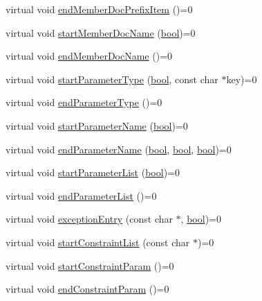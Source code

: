\begin{DoxyCompactItemize}
\item 
virtual void \hyperlink{class_output_generator_a8fa59aa64d420ced1d1784f7b2ddaa79}{end\+Member\+Doc\+Prefix\+Item} ()=0
\item 
virtual void \hyperlink{class_output_generator_a8646f44dc5c56ef3f6d5fa3f667cd223}{start\+Member\+Doc\+Name} (\hyperlink{qglobal_8h_a1062901a7428fdd9c7f180f5e01ea056}{bool})=0
\item 
virtual void \hyperlink{class_output_generator_a02431abad8b2d94216a0530cf08b3dca}{end\+Member\+Doc\+Name} ()=0
\item 
virtual void \hyperlink{class_output_generator_a76af87c960b045eafa035b77307aaf75}{start\+Parameter\+Type} (\hyperlink{qglobal_8h_a1062901a7428fdd9c7f180f5e01ea056}{bool}, const char $\ast$key)=0
\item 
virtual void \hyperlink{class_output_generator_a8c701cf1050103eee69d57b409640dea}{end\+Parameter\+Type} ()=0
\item 
virtual void \hyperlink{class_output_generator_ac56057350d3b14b63238bf4325792f82}{start\+Parameter\+Name} (\hyperlink{qglobal_8h_a1062901a7428fdd9c7f180f5e01ea056}{bool})=0
\item 
virtual void \hyperlink{class_output_generator_a69b117731ab42b3985713760b270a1a5}{end\+Parameter\+Name} (\hyperlink{qglobal_8h_a1062901a7428fdd9c7f180f5e01ea056}{bool}, \hyperlink{qglobal_8h_a1062901a7428fdd9c7f180f5e01ea056}{bool}, \hyperlink{qglobal_8h_a1062901a7428fdd9c7f180f5e01ea056}{bool})=0
\item 
virtual void \hyperlink{class_output_generator_a92e7646944e62d50ede52caa18c39266}{start\+Parameter\+List} (\hyperlink{qglobal_8h_a1062901a7428fdd9c7f180f5e01ea056}{bool})=0
\item 
virtual void \hyperlink{class_output_generator_acc2f021cf85b5cb83716c51e3dc7d44f}{end\+Parameter\+List} ()=0
\item 
virtual void \hyperlink{class_output_generator_a4c4d0ff79434d93b42b8e0c7c42fa5d1}{exception\+Entry} (const char $\ast$, \hyperlink{qglobal_8h_a1062901a7428fdd9c7f180f5e01ea056}{bool})=0
\item 
virtual void \hyperlink{class_output_generator_a745e4b1d9843812a09c4410aa43084b0}{start\+Constraint\+List} (const char $\ast$)=0
\item 
virtual void \hyperlink{class_output_generator_abce5f3b4a1104ca8cea00f19f0d803c0}{start\+Constraint\+Param} ()=0
\item 
virtual void \hyperlink{class_output_generator_afacff7ea600037f0e6fc29207f06332e}{end\+Constraint\+Param} ()=0

\end{DoxyCompactItemize}
